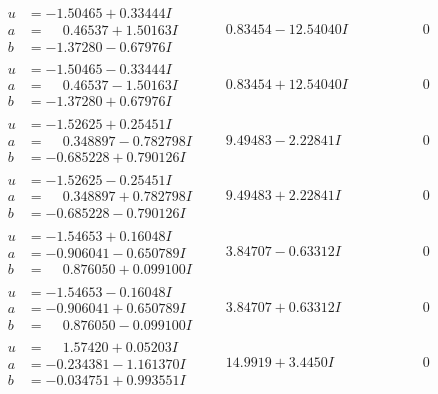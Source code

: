 \documentclass[1p]{elsarticle_modified}
\theoremstyle{definition}
\begin{document}
$$\begin{array}{c|c|c}
\begin{aligned}
u &= -1.50465 + 0.33444 I \\
a &= \phantom{-}0.46537 + 1.50163 I \\
b &= -1.37280 - 0.67976 I\end{aligned}
 & \phantom{-}0.83454 - 12.54040 I & \phantom{-0.000000 } 0 \\ \hline\begin{aligned}
u &= -1.50465 - 0.33444 I \\
a &= \phantom{-}0.46537 - 1.50163 I \\
b &= -1.37280 + 0.67976 I\end{aligned}
 & \phantom{-}0.83454 + 12.54040 I & \phantom{-0.000000 } 0 \\ \hline\begin{aligned}
u &= -1.52625 + 0.25451 I \\
a &= \phantom{-}0.348897 - 0.782798 I \\
b &= -0.685228 + 0.790126 I\end{aligned}
 & \phantom{-}9.49483 - 2.22841 I & \phantom{-0.000000 } 0 \\ \hline\begin{aligned}
u &= -1.52625 - 0.25451 I \\
a &= \phantom{-}0.348897 + 0.782798 I \\
b &= -0.685228 - 0.790126 I\end{aligned}
 & \phantom{-}9.49483 + 2.22841 I & \phantom{-0.000000 } 0 \\ \hline\begin{aligned}
u &= -1.54653 + 0.16048 I \\
a &= -0.906041 - 0.650789 I \\
b &= \phantom{-}0.876050 + 0.099100 I\end{aligned}
 & \phantom{-}3.84707 - 0.63312 I & \phantom{-0.000000 } 0 \\ \hline\begin{aligned}
u &= -1.54653 - 0.16048 I \\
a &= -0.906041 + 0.650789 I \\
b &= \phantom{-}0.876050 - 0.099100 I\end{aligned}
 & \phantom{-}3.84707 + 0.63312 I & \phantom{-0.000000 } 0 \\ \hline\begin{aligned}
u &= \phantom{-}1.57420 + 0.05203 I \\
a &= -0.234381 - 1.161370 I \\
b &= -0.034751 + 0.993551 I\end{aligned}
 & \phantom{-}14.9919 + 3.4450 I & \phantom{-0.000000 } 0 \\ \hline\begin{aligned}

\end{aligned}
\end{array}$$
\end{document}
